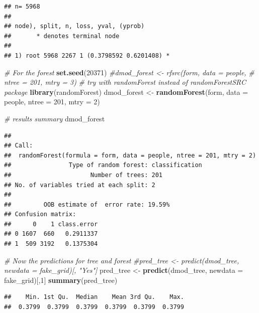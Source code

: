 \documentclass[]{article}
\newenvironment{Shaded}{\begin{snugshade}}{\end{snugshade}}
\newcommand{\KeywordTok}[1]{\textcolor[rgb]{0.13,0.29,0.53}{\textbf{{#1}}}}
\newcommand{\DataTypeTok}[1]{\textcolor[rgb]{0.13,0.29,0.53}{{#1}}}
\newcommand{\DecValTok}[1]{\textcolor[rgb]{0.00,0.00,0.81}{{#1}}}
\newcommand{\StringTok}[1]{\textcolor[rgb]{0.31,0.60,0.02}{{#1}}}
\newcommand{\CommentTok}[1]{\textcolor[rgb]{0.56,0.35,0.01}{\textit{{#1}}}}
\newcommand{\NormalTok}[1]{{#1}}
\begin{document}
\begin{verbatim}
## n= 5968 
## 
## node), split, n, loss, yval, (yprob)
##       * denotes terminal node
## 
## 1) root 5968 2267 1 (0.3798592 0.6201408) *
\end{verbatim}

\begin{Shaded}
\begin{Highlighting}[]
\CommentTok{# For the forest}
\KeywordTok{set.seed}\NormalTok{(}\DecValTok{20371}\NormalTok{)}
\CommentTok{#dmod_forest <- rfsrc(form, data = people, }
\CommentTok{#                     ntree = 201, mtry = 3)}
\CommentTok{# try with randomForest instead of randomForestSRC package}
\KeywordTok{library}\NormalTok{(randomForest)}
\NormalTok{dmod_forest <-}\StringTok{ }\KeywordTok{randomForest}\NormalTok{(form, }\DataTypeTok{data =} \NormalTok{people, }
                     \DataTypeTok{ntree =} \DecValTok{201}\NormalTok{, }\DataTypeTok{mtry =} \DecValTok{2}\NormalTok{)}

\CommentTok{# results summary}
\NormalTok{dmod_forest}
\end{Highlighting}
\end{Shaded}

\begin{verbatim}
## 
## Call:
##  randomForest(formula = form, data = people, ntree = 201, mtry = 2) 
##                Type of random forest: classification
##                      Number of trees: 201
## No. of variables tried at each split: 2
## 
##         OOB estimate of  error rate: 19.59%
## Confusion matrix:
##      0    1 class.error
## 0 1607  660   0.2911337
## 1  509 3192   0.1375304
\end{verbatim}

\begin{Shaded}
\begin{Highlighting}[]
\CommentTok{# Now the predictions for tree and forest}
\CommentTok{#pred_tree <- predict(dmod_tree, newdata = fake_grid)[, "Yes"]}
\NormalTok{pred_tree <-}\StringTok{ }\KeywordTok{predict}\NormalTok{(dmod_tree, }\DataTypeTok{newdata =} \NormalTok{fake_grid)[,}\DecValTok{1}\NormalTok{]}
\KeywordTok{summary}\NormalTok{(pred_tree)}
\end{Highlighting}
\end{Shaded}

\begin{verbatim}
##    Min. 1st Qu.  Median    Mean 3rd Qu.    Max. 
##  0.3799  0.3799  0.3799  0.3799  0.3799  0.3799
\end{verbatim}
\end{document}

